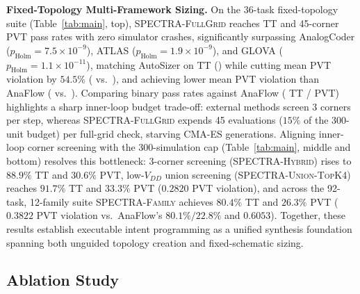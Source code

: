 \textbf{Fixed-Topology Multi-Framework Sizing.} On the 36-task fixed-topology suite (Table~\ref{tab:main}, top), \textsc{SPECTRA-FullGrid} reaches \SizSpectraTTPct{} TT and \SizSpectraPVTPct{} 45-corner PVT pass rates with zero simulator crashes, significantly surpassing AnalogCoder ($p_{\text{Holm}}=7.5\times 10^{-9}$), ATLAS ($p_{\text{Holm}}=1.9\times 10^{-9}$), and GLOVA ($p_{\text{Holm}}=1.1\times 10^{-11}$), matching AutoSizer on TT (\SizAutoSizerTTPct{}) while cutting mean PVT violation by $54.5\%$ (\SizSpectraPVTViol{} vs.\ \SizAutoSizerPVTViol{}), and achieving lower mean PVT violation than AnaFlow (\SizSpectraPVTViol{} vs.\ \SizAnaFlowPVTViol{}). Comparing binary pass rates against AnaFlow (\SizAnaFlowTTPct{} TT / \SizAnaFlowPVTPct{} PVT) highlights a sharp inner-loop budget trade-off: external methods screen 3 corners per step, whereas \textsc{SPECTRA-FullGrid} expends 45 evaluations ($15\%$ of the 300-unit budget) per full-grid check, starving CMA-ES generations. Aligning inner-loop corner screening with the 300-simulation cap (Table~\ref{tab:main}, middle and bottom) resolves this bottleneck: 3-corner screening (\textsc{SPECTRA-Hybrid}) rises to $88.9\%$ TT and $30.6\%$ PVT, low-$V_{DD}$ union screening (\textsc{SPECTRA-Union-TopK4}) reaches $91.7\%$ TT and $33.3\%$ PVT ($0.2820$ PVT violation), and across the 92-task, 12-family suite \textsc{SPECTRA-Family} achieves $80.4\%$ TT and $26.3\%$ PVT ($0.3822$ PVT violation vs.\ AnaFlow's $80.1\%/22.8\%$ and $0.6053$). Together, these results establish executable intent programming as a unified synthesis foundation spanning both unguided topology creation and fixed-schematic sizing.

\subsection{Ablation Study}
\label{sec:ablation}


